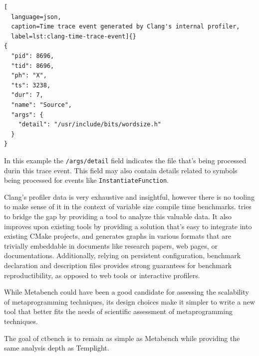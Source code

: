 \documentclass[../main]{subfiles}
\begin{document}
\begin{lstlisting}[
  language=json,
  caption=Time trace event generated by Clang's internal profiler,
  label=lst:clang-time-trace-event]{}
{
  "pid": 8696,
  "tid": 8696,
  "ph": "X",
  "ts": 3238,
  "dur": 7,
  "name": "Source",
  "args": {
    "detail": "/usr/include/bits/wordsize.h"
  }
}
\end{lstlisting}

In this example the \lstinline{/args/detail} field indicates the file that's
being processed durin this trace event. This field may also contain details
related to symbols being processed for events like
\lstinline{InstantiateFunction}.

Clang's profiler data is very exhaustive and insightful, however there is no
tooling to make sense of it in the context of variable size compile time
benchmarks. \ctbench tries to bridge the gap by providing a tool to analyze
this valuable data. It also improves upon existing tools by providing a solution
that's easy to integrate into existing CMake projects, and generates graphs in
various formats that are trivially embeddable in documents like research papers,
web pages, or documentations. Additionally, relying on persistent configuration,
benchmark declaration and description files provides strong guarantees for
benchmark reproductibility, as opposed to web tools or interactive profilers.

While Metabench could have been a good candidate for assessing the scalability
of metaprogramming techniques, its design choices make it simpler to write a new
tool that better fits the needs of scientific assessment of metaprogramming
techniques.

The goal of ctbench is to remain as simple as Metabench while providing
the same analysis depth as Templight.
\end{document}
